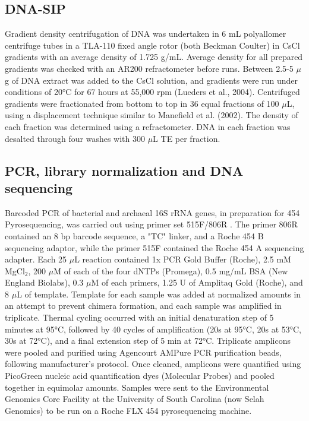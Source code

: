 \subsection{DNA-SIP}
 Gradient density centrifugation of DNA was undertaken in 6 mL polyallomer
 centrifuge tubes in a TLA-110 fixed angle rotor (both Beckman Coulter) in CsCl
 gradients with an average density of 1.725 g/mL.  Average density for all
 prepared gradients was checked with an AR200 refractometer before runs.
 Between 2.5-5 $\mu$g of DNA extract was added to the CsCl solution, and
 gradients were run under conditions of 20°C for 67 hours at 55,000 rpm
 (Lueders et al., 2004). Centrifuged gradients were fractionated from bottom to
 top in 36 equal fractions of 100 $\mu$L, using a displacement technique
 similar to Manefield et al. (2002). The density of each fraction was
 determined using a refractometer. DNA in each fraction was desalted through
 four washes with 300 $\mu$L TE per fraction.  \subsection{PCR, library
 normalization and DNA sequencing} Barcoded PCR of bacterial and archaeal 16S
 rRNA genes, in preparation for 454 Pyrosequencing, was carried out using
 primer set 515F/806R \citep{21349862}.  The primer 806R contained an 8 bp
 barcode sequence, a "TC" linker, and a Roche 454 B sequencing adaptor, while
 the primer 515F contained the Roche 454 A sequencing adapter. Each 25 $\mu$L
 reaction contained 1x PCR Gold Buffer (Roche), 2.5 mM MgCl$_{2}$, 200 $\mu$M
 of each of the four dNTPs (Promega), 0.5 mg/mL BSA (New England Biolabs), 0.3
 $\mu$M of each primers, 1.25 U of Amplitaq Gold (Roche), and 8 $\mu$L of
 template. Template for each sample was added at normalized amounts in an
 attempt to prevent chimera formation, and each sample was amplified in
 triplicate. Thermal cycling occurred with an initial denaturation step of 5
 minutes at 95°C, followed by 40 cycles of amplification (20s at 95°C, 20s at
 53°C, 30s at 72°C), and a final extension step of 5 min at 72°C. Triplicate
 amplicons were pooled and purified using Agencourt AMPure PCR purification
 beads, following manufacturer’s protocol. Once cleaned, amplicons were
 quantified using PicoGreen nucleic acid quantification dyes (Molecular Probes)
 and pooled together in equimolar amounts. Samples were sent to the
 Environmental Genomics Core Facility at the University of South Carolina (now
 Selah Genomics) to be run on a Roche FLX 454 pyrosequencing machine. 

